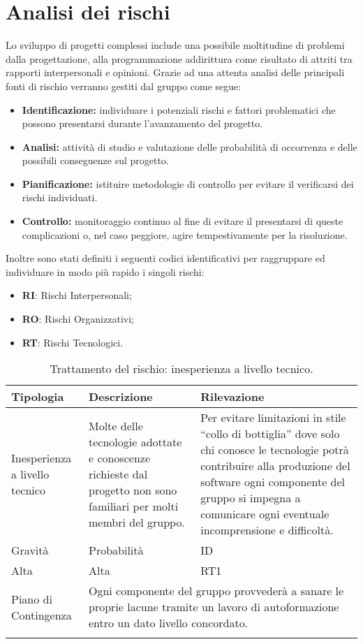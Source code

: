 \section{Analisi dei rischi}

	Lo sviluppo di progetti complessi include una possibile moltitudine di problemi dalla progettazione, alla programmazione addirittura come risultato di attriti tra rapporti interpersonali e opinioni. Grazie ad una attenta analisi delle principali fonti di rischio verranno gestiti dal gruppo come segue:
	\begin{itemize}
		\item \textbf{Identificazione:} individuare i potenziali rischi e fattori problematici che possono presentarsi durante l’avanzamento del progetto.
		\item \textbf{Analisi:} attività di studio e valutazione delle probabilità di occorrenza e delle possibili conseguenze sul progetto.
		\item \textbf{Pianificazione:} istituire metodologie di controllo per evitare il verificarsi dei rischi individuati.
		\item \textbf{Controllo:} monitoraggio continuo al fine di evitare il presentarsi di queste complicazioni o, nel caso peggiore, agire tempestivamente per la risoluzione.
	\end{itemize}
	
	Inoltre sono stati definiti i seguenti codici identificativi per raggruppare ed individuare in modo più rapido i singoli rischi:
	\begin{itemize}
		\item \textbf{RI}: Rischi Interpersonali;
		\item \textbf{RO}: Rischi Organizzativi;
		\item \textbf{RT}: Rischi Tecnologici.
	\end{itemize}


\begin{center}
	\begin{longtable}{| p{5cm} | p{5cm} | p{5cm} |}
		\hline
		\rowcolor[HTML]{F9CB9C} 
		Tipologia & Descrizione & Rilevazione \\ \hline
		Inesperienza a livello tecnico & Molte delle tecnologie adottate e conoscenze richieste dal progetto non sono familiari per molti membri del gruppo. & Per evitare limitazioni in stile “collo di bottiglia” dove solo chi conosce le tecnologie potrà contribuire alla produzione del software ogni componente del gruppo si impegna a comunicare ogni eventuale incomprensione e difficoltà. \\ 
		\hline
		\rowcolor[HTML]{F9CB9C} 
		Gravità & Probabilità & ID  \\ \hline
		Alta & Alta & RT1  \\ \hline
		\cellcolor[HTML]{F9CB9C} Piano di Contingenza & \multicolumn{2}{|p{10cm}|}{Ogni componente del gruppo provvederà a sanare le proprie lacune tramite un lavoro di autoformazione entro un dato livello concordato.} \\ \hline
		\caption{Trattamento del rischio: inesperienza a livello tecnico.}
		\label{fig: Trattamento del rischio: inesperienza a livello tecnico.}
	\end{longtable}
\end{center}

